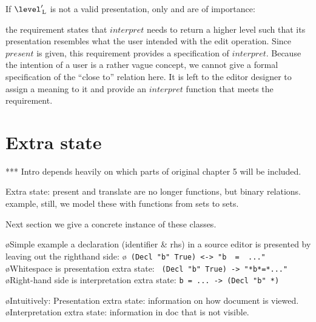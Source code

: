 
If $\level'\L$ is not a valid presentation, only  and  are of importance:


the requirement states that $interpret$ needs to return a higher level such that its presentation resembles what the user intended with the edit operation. Since $present$ is given, this requirement provides a specification of $interpret$. Because the intention of a user is a rather vague concept, we cannot give a formal specification of the ``close to'' relation here. It is left to the editor designer to assign a meaning to it and provide an $interpret$ function that meets the requirement.




%																
%																
%																
\section{Extra state} \label{sect:singleExtra}

\toHere

*** Intro depends heavily on which parts of original chapter 5 will be included.

Extra state: present and translate are no longer functions, but binary relations. example, still, we model these with functions from sets to sets.

Next section we give a concrete instance of these classes.

\bl
\o Simple example a declaration (identifier \& rhs) in a source editor is presented by leaving out the righthand side:
\o  \verb| (Decl "b" True) <-> "b  =  ..."|
\o Whitespace is presentation extra state: \verb| (Decl "b" True) -> "*b*=*..."|
\o Right-hand side is interpretation extra state: \verb|b = ... -> (Decl "b" *)|
\el

\bl
\o Intuitively: Presentation extra state: information on how document is viewed. 
\o Interpretation extra state: information in doc that is not visible. 
\el

